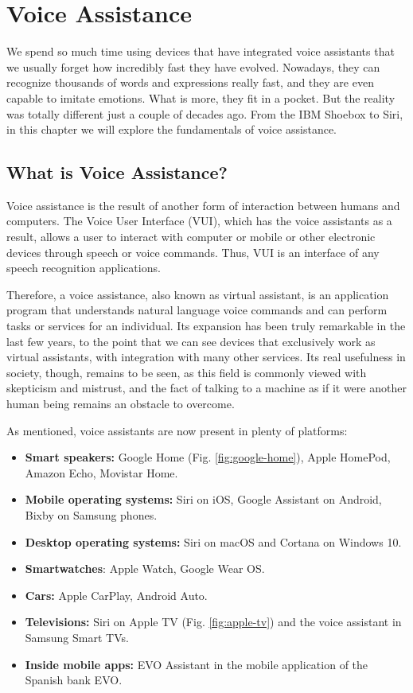 \chapter{Voice Assistance}

We spend so much time using devices that have integrated voice assistants that we usually forget how incredibly fast they have
evolved. Nowadays, they can recognize thousands of words and expressions really fast, and they are even capable to imitate
emotions. What is more, they fit in a pocket. But the reality was totally different just a couple of decades ago. From the IBM
Shoebox to Siri, in this chapter we will explore the fundamentals of voice assistance.

\section{What is Voice Assistance?}
Voice assistance is the result of another form of interaction between humans and computers.\cite{botsocietyVUI} The Voice User
Interface (VUI), which has the voice assistants as a result, allows a user to interact with computer or mobile or other electronic
devices through speech or voice commands. Thus, VUI is an interface of any speech recognition applications.

Therefore, a voice assistance, also known as virtual assistant, is an application program that understands natural language voice
commands and can perform tasks or services for an individual. Its expansion has been truly remarkable in the last few years, to the
point that we can see devices that exclusively work as virtual assistants, with integration with many other services. Its real usefulness
in society, though, remains to be seen, as this field is commonly viewed with skepticism and mistrust, and the fact of talking to a
machine as if it were another human being remains an obstacle to overcome.

As mentioned, voice assistants are now present in plenty of platforms:
\begin{itemize}
	\item \textbf{Smart speakers:} Google Home (Fig. \ref{fig:google-home}), Apple HomePod, Amazon Echo, Movistar Home.
	\item \textbf{Mobile operating systems:} Siri on iOS, Google Assistant on Android, Bixby on Samsung phones.
	\item \textbf{Desktop operating systems:} Siri on macOS and Cortana on Windows 10.
	\item \textbf{Smartwatches}: Apple Watch, Google Wear OS.
	\item \textbf{Cars:} Apple CarPlay, Android Auto.
	\item \textbf{Televisions:} Siri on Apple TV (Fig. \ref{fig:apple-tv}) and the voice assistant in Samsung Smart TVs.
	\item \textbf{Inside mobile apps:} EVO Assistant in the mobile application of the Spanish bank EVO.
\end{itemize}

